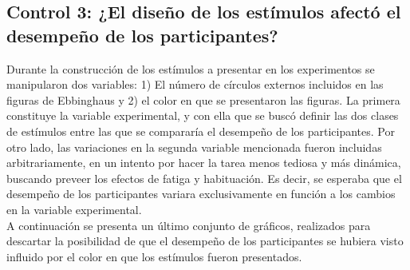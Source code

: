 \subsection{Control 3: ¿El diseño de los estímulos afectó el desempeño de los participantes?}

Durante la construcción de los estímulos a presentar en los experimentos se manipularon dos variables: 1) El número de círculos externos incluidos en las figuras de Ebbinghaus y 2) el color en que se presentaron las figuras. La primera constituye la variable experimental, y con ella que se buscó definir las dos clases de estímulos entre las que se compararía el desempeño de los participantes. Por otro lado, las variaciones en la segunda variable mencionada fueron incluidas arbitrariamente, en un intento por hacer la tarea menos tediosa y más dinámica, buscando preveer los efectos de fatiga y habituación. Es decir, se esperaba que el desempeño de los participantes variara exclusivamente en función a los cambios en la variable experimental.\\

A continuación se presenta un último conjunto de gráficos, realizados para descartar la posibilidad de que el desempeño de los participantes se hubiera visto influido por el color en que los estímulos fueron presentados.\\


